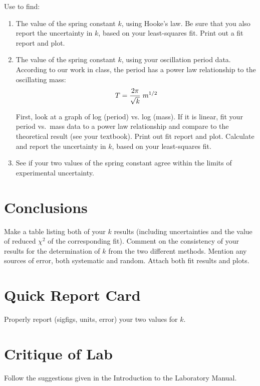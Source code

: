      Use \WAPP to find:
\begin{enumerate}     
\item The value of the spring constant $k$, using Hooke's law.  Be sure
that you also report the uncertainty in $k$, based on your least-squares
fit.  Print out a fit report and  plot.


 
\item The value of the spring constant $k$, using your 
         oscillation period data. According to our work 
in class, the period has a power law relationship
to the oscillating mass:
\[ T={2\pi\over\sqrt{k}}\; m^{1/2} \]

First, look at a graph of log (period) vs. log (mass).  If it is linear, fit your period vs.\ mass data to a power law relationship and compare to the theoretical result (see your textbook).
Print out fit report and  plot.
Calculate and report the uncertainty in $k$, based on your least-squares
fit.

\item See if your two values 
         of the spring constant agree within the limits of 
         experimental uncertainty.  
\end{enumerate}


\section*{Conclusions}
Make a table listing both of your $k$ results (including uncertainties and the
value of reduced $\chi^2$ of the corresponding fit).
Comment on the consistency of your results for the determination of $k$ from
the two different methods.  Mention any sources of error, both
systematic and random.  Attach both fit results and plots.

\section*{Quick Report Card}
Properly report (sigfigs, units, error) your two values for $k$.

\section*{Critique of Lab}
     Follow the suggestions given in the Introduction to the
Laboratory Manual.
